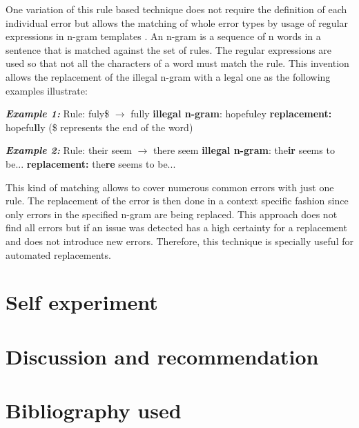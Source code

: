 \documentclass[runningheads]{llncs}
\begin{document}
One variation of this rule based technique does not require the definition of each individual error but allows the matching of whole error types by usage of regular expressions in n-gram templates \citep{kantrowitz_method_2003}. An n-gram is a sequence of n words in a sentence that is matched against the set of rules. The regular expressions are used so that not all the characters of a word must match the rule. This invention allows the replacement of the illegal n-gram with a legal one as the following examples illustrate:

\textbf{\textit{Example 1:}}
\newline Rule: fuly\$ $\rightarrow$ fully
\newline\textbf{illegal n-gram}: hopefu\textbf{l}ey
\newline\textbf{replacement:} hopefu\textbf{ll}y
\newline(\$ represents the end of the word)

\textbf{\textit{Example 2:}}
\newline Rule: their seem $\rightarrow$ there seem
\newline\textbf{illegal n-gram}: the\textbf{ir} seems to be...
\newline\textbf{replacement:} the\textbf{re} seems to be...

This kind of matching allows to cover numerous common errors with just one rule. The replacement of the error is then done in a context specific fashion since only errors in the specified n-gram are being replaced. This approach does not find all errors but if an issue was detected has a high certainty for a replacement and does not introduce new errors. Therefore, this technique is specially useful for automated replacements.


\section{Self experiment}


\section{Discussion and recommendation}



\section{Bibliography used}

\printbibliography
\end{document}
